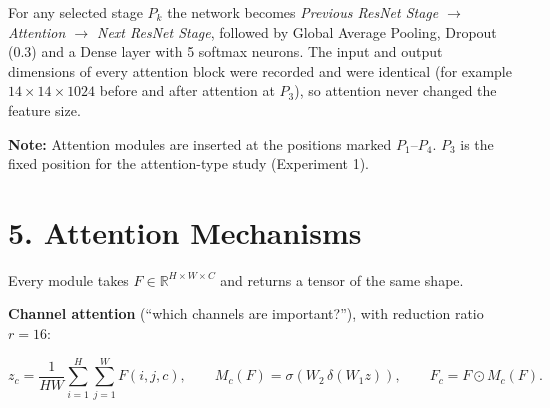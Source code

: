 \documentclass[10pt]{article}
\begin{document}
For any selected stage $P_k$ the network becomes
\emph{Previous ResNet Stage $\rightarrow$ Attention $\rightarrow$ Next ResNet Stage},
followed by Global Average Pooling, Dropout (0.3) and a Dense layer with 5
softmax neurons. The input and output dimensions of every attention block
were recorded and were identical (for example $14\times14\times1024$
before and after attention at $P_3$), so attention never changed the
feature size.

\begin{center}
\end{center}

\textbf{Note:} Attention modules are inserted at the positions marked
$P_1$--$P_4$. $P_3$ is the fixed position for the attention-type study
(Experiment 1).

\section*{5. Attention Mechanisms}

Every module takes $F\in\mathbb{R}^{H\times W\times C}$ and returns a tensor
of the same shape.

\textbf{Channel attention} (``which channels are important?''), with
reduction ratio $r=16$:

\[
z_c=\frac{1}{HW}\sum_{i=1}^{H}\sum_{j=1}^{W}F(i,j,c),\qquad
M_c(F)=\sigma\left(W_2\,\delta(W_1 z)\right),\qquad
F_c=F\odot M_c(F).
\]
\end{document}
